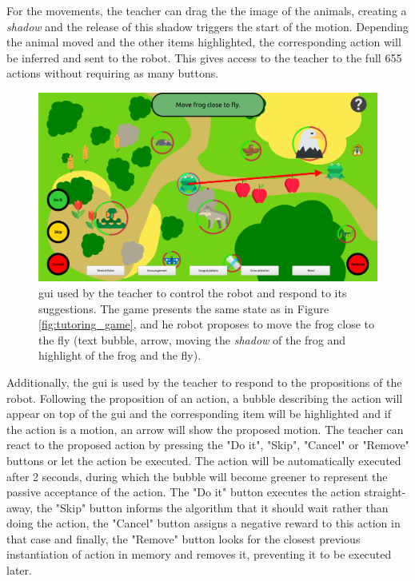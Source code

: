 For the movements, the teacher can drag the the image of the animals, creating a \textit{shadow} and the release of this shadow triggers the start of the motion. Depending the animal moved and the other items highlighted, the corresponding action will be inferred and sent to the robot. This gives access to the teacher to the full 655 actions without requiring as many buttons.

\begin{figure}[ht]
	\centering
	\includegraphics[width=1\textwidth]{gui.png}
	\captionsetup{width=.9\linewidth}
	\caption{\gls{gui} used by the teacher to control the robot and respond to its suggestions. The game presents the same state as in Figure \ref{fig:tutoring_game}, and he robot proposes to move the frog close to the fly (text bubble, arrow, moving the \textit{shadow} of the frog and highlight of the frog and the fly).}
	\label{fig:tutoring_gui}
\end{figure}

Additionally, the \gls{gui} is used by the teacher to respond to the propositions of the robot. Following the proposition of an action, a bubble describing the action will appear on top of the \gls{gui} and the corresponding item will be highlighted and if the action is a motion, an arrow will show the proposed motion. The teacher can react to the proposed action by pressing the "Do it", "Skip", "Cancel" or "Remove" buttons or let the action be executed. The action will be automatically executed after 2 seconds, during which the bubble will become greener to represent the passive acceptance of the action. The "Do it" button executes the action straight-away, the "Skip" button informs the algorithm that it should wait rather than doing the action, the "Cancel" button assigns a negative reward to this action in that case and finally, the "Remove" button looks for the closest previous instantiation of action in memory and removes it, preventing it to be executed later.

